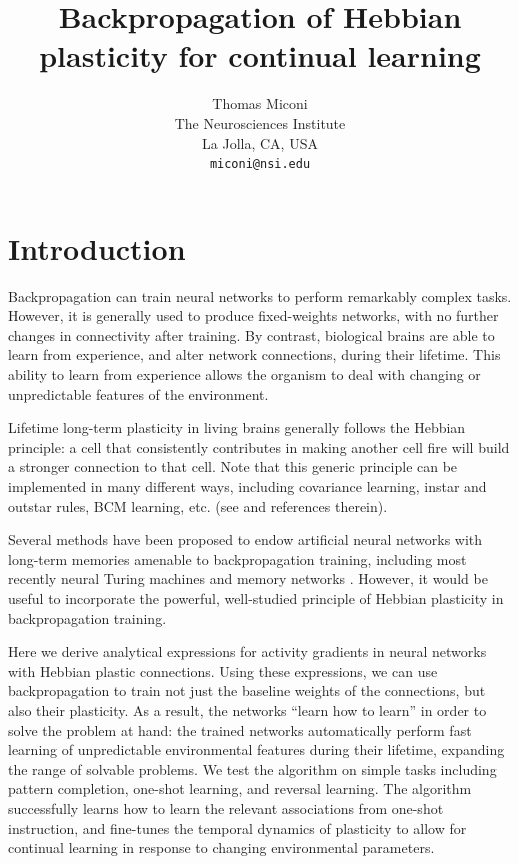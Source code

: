 \documentclass{article}
\title{\Large Backpropagation of Hebbian plasticity for continual learning}
\author{
    Thomas Miconi\\
    The Neurosciences Institute\\
    La Jolla, CA, USA\\
    \texttt{miconi@nsi.edu}\\
}
\begin{document}
\maketitle

\section{Introduction}
Backpropagation can train neural networks to perform remarkably complex
tasks. However, it is generally used to produce fixed-weights networks, with no further changes in connectivity after training. 
By contrast, 
biological brains are able to learn from
experience, and alter network connections, during their lifetime. This ability to learn from experience allows the  organism to deal with changing or unpredictable features of the environment.

Lifetime long-term plasticity in living brains generally follows the Hebbian principle: a
cell that consistently contributes in making another cell fire will build a
stronger connection to that cell. Note that this generic principle can be
implemented in many different ways, including covariance learning, instar and
outstar rules, BCM learning, etc. (see \cite{Vasilkoski2011-ww} and references therein). 

Several methods have been proposed to endow artificial neural networks with
long-term memories amenable to backpropagation training,  including most
recently neural Turing machines \cite{Graves2014-ch,Santoro2016-jn} and memory
networks \cite{Sukhbaatar2015-ly}. However, it would be useful to incorporate
the powerful, well-studied principle of Hebbian plasticity in backpropagation
training.

Here we derive analytical expressions for activity gradients in neural networks with
Hebbian plastic connections. Using these expressions, we can use backpropagation
to train not just the baseline weights of the connections, but also their
plasticity. As a result, the networks ``learn how to learn''  in order to solve
the problem at hand: the trained networks automatically perform fast learning of
unpredictable environmental features during their lifetime, expanding the range
of solvable problems. We test the algorithm on simple tasks including pattern
completion, one-shot learning, and reversal learning.  The algorithm
successfully learns how to learn the relevant associations from one-shot
instruction, and fine-tunes the temporal dynamics of plasticity to allow for
continual learning in response to changing environmental parameters. 
\end{document}
